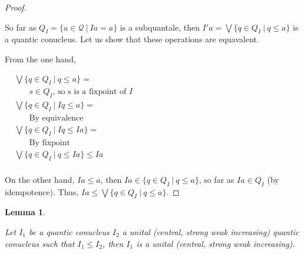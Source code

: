 \documentclass[a4paper]{article}
\theoremstyle{defin}
\theoremstyle{theorem}
\theoremstyle{prop}
\theoremstyle{lemma}
\newtheorem{lemma}{Lemma}
\theoremstyle{ex}
\theoremstyle{col}
\begin{document}
\begin{proof}
$ $

So far as $Q_{I} = \{ a \in \mathcal{Q} \: | \: I a = a \}$ is a subquantale, then $I' a = \bigvee \{ q \in Q_{I} \: | \: q \leq a \}$ is a quantic conucleus. Let us show that these operations are equavalent.

From the one hand,

$\begin{array}{lll}
&\bigvee \{ q \in Q_{I} \: | \: q \leq a \} = & \\
& \:\:\:\:\:\:\:\: \text{$s \in Q_{I}$, so s is a fixpoint of $I$} & \\
&\bigvee \{ q \in Q_{I} \: | \: I q \leq a \} = & \\
& \:\:\:\:\:\:\:\: \text{By equivalence}& \\
&\bigvee \{ q \in Q_{I} \: | \: I q \leq I a \} = & \\
& \:\:\:\:\:\:\:\: \text{By fixpoint} & \\
&\bigvee \{ q \in Q_{I} \: | \: q \leq I a \} \leq I a& \\
\end{array}$

On the other hand, $I a \leq a$, then $I a \in \{ q \in Q_{I} \: | \: q \leq a \}$, so far as $I a \in Q_{I}$ (by idempotence). Thus, $I a \leq \bigvee \{ q \in Q_{I} \: | \: q \leq a \}$.

\end{proof}

\begin{lemma}
$ $

Let $I_1$ be a quantic conucleus $I_2$ a unital (central, strong weak increasing) quantic conucleus such that $I_1 \leq I_2$,
then $I_1$ is a unital (central, strong weak increasing).

\end{lemma}
\end{document}
